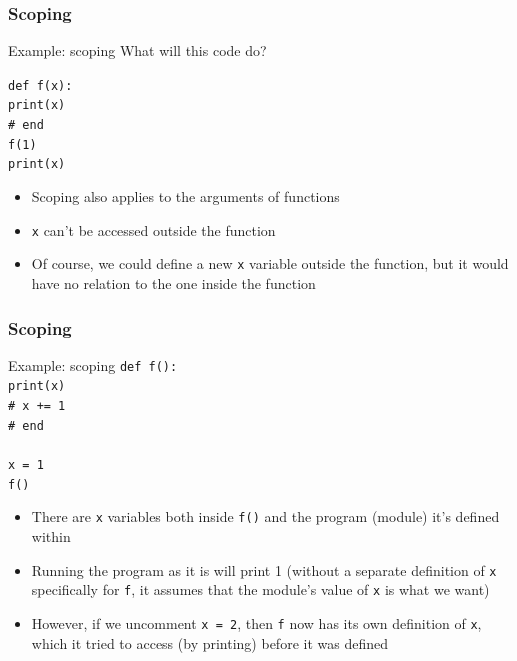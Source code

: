 \documentclass{beamer}
\newcommand{\code}[1]{\texttt{#1}}
\newcommand{\tab}{\hspace*{22pt}}
\begin{document}
\begin{frame}%
	\frametitle{Scoping}
	
	\begin{block}{Example: scoping}
			What will this code do?
			
			\vspace{10pt}
			
			\code{def f(x):\\[-3pt]
			\tab print(x) \\[-3pt]
			\#  end \\[6pt]
			f(1) \\
			print(x)
			}
		\endminipage\hfill
			\begin{itemize}
				\item Scoping also applies to the arguments of functions
				\item \code{x} can't be accessed outside the function
				\item Of course, we could define a new \code{x} variable outside the function, but it would have no relation to the one inside the function
			\end{itemize}
		\endminipage\hfill
	\end{block}
	
\end{frame}

\begin{frame}%
	\frametitle{Scoping}
	
	\begin{block}{Example: scoping}
			\code{def f():\\
			\tab print(x) \\
			\tab \# x += 1 \\
			\#  end \\
			\tab \\
			x = 1 \\
			f()
			}
		\endminipage\hfill
			\begin{itemize}
				\item There are \code{x} variables both inside \code{f()} and the program (module) it's defined within
				\item Running the program as it is will print 1 (without a separate definition of \code{x} specifically for \code{f}, it assumes that the module's value of \code{x} is what we want)
				\item However, if we uncomment \code{x = 2}, then \code{f} now has its own definition of \code{x}, which it tried to access (by printing) before it was defined
			\end{itemize}
		\endminipage\hfill
	\end{block}
	
\end{frame}
\end{document}
